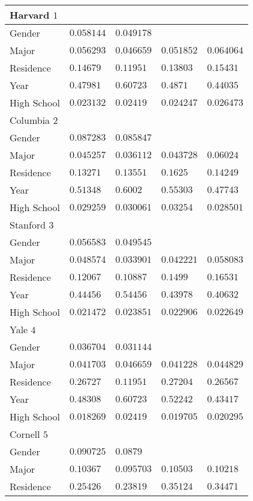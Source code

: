 \begin{center}
\begin{longtable}{|l|l|l|l|l|}
Harvard $1$ & & &   \\ \hline
Gender & $0.058144$ & $0.049178$ & & \\
Major & $0.056293$ & $0.046659$ & $0.051852$ & $0.064064$ \\
Residence & $0.14679$ & $0.11951$ & $0.13803$ & $0.15431$ \\
Year & $0.47981$ & $0.60723$ & $0.4871$ & $0.44035$ \\
High School & $0.023132$ & $0.02419$ & $0.024247$ & $0.026473$ \\ \hline \hline
Columbia $2$ & & &   \\ \hline
Gender & $0.087283$ & $0.085847$ & & \\
Major & $0.045257$ & $0.036112$ & $0.043728$ & $0.06024$ \\
Residence & $0.13271$ & $0.13551$ & $0.1625$ & $0.14249$ \\
Year & $0.51348$ & $0.6002$ & $0.55303$ & $0.47743$ \\
High School & $0.029259$ & $0.030061$ & $0.03254$ & $0.028501$ \\ \hline \hline
Stanford $3$ & & &   \\ \hline
Gender & $0.056583$ & $0.049545$ & & \\
Major & $0.048574$ & $0.033901$ & $0.042221$ & $0.058083$ \\
Residence & $0.12067$ & $0.10887$ & $0.1499$ & $0.16531$ \\
Year & $0.44456$ & $0.54456$ & $0.43978$ & $0.40632$ \\
High School & $0.021472$ & $0.023851$ & $0.022906$ & $0.022649$ \\ \hline \hline
Yale $4$ & & &   \\ \hline
Gender & $0.036704$ & $0.031144$ & & \\
Major & $0.041703$ & $0.046659$ & $0.041228$ & $0.044829$ \\
Residence & $0.26727$ & $0.11951$ & $0.27204$ & $0.26567$ \\
Year & $0.48308$ & $0.60723$ & $0.52242$ & $0.43417$ \\
High School & $0.018269$ & $0.02419$ & $0.019705$ & $0.020295$ \\ \hline \hline
Cornell $5$ & & &   \\ \hline
Gender & $0.090725$ & $0.0879$ & & \\
Major & $0.10367$ & $0.095703$ & $0.10503$ & $0.10218$ \\
Residence & $0.25426$ & $0.23819$ & $0.35124$ & $0.34471$ \\

\end{longtable}
\end{center}
